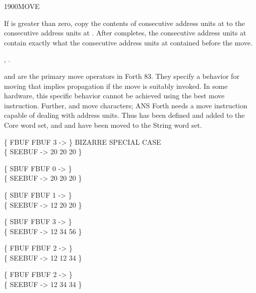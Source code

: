 \begin{worddef}{1900}{MOVE}
\item {}

	If  is greater than zero, copy the contents of 
	consecutive address units at  to the 
	consecutive address units at . After 
	completes, the  consecutive address units at 
	contain exactly what the  consecutive address units at
	 contained before the move.

\see	{},
	.

	\begin{defer}
	\rationale %
		 and  are the primary
		move operators in Forth 83. They specify a behavior for moving
		that implies propagation if the move is suitably invoked. In
		some hardware, this specific behavior cannot be achieved using
		the best move instruction. Further,  and
		 move characters; ANS Forth needs a move
		instruction capable of dealing with address units. Thus
		 has been defined and added to the Core word set,
		and  and  have been
		moved to the String word set.

	\testing
		\{ FBUF FBUF 3   -> \} \tab[3]  BIZARRE SPECIAL CASE \\
		\{ SEEBUF -> 20 20 20 \}

		\{ SBUF FBUF 0   -> \} \\
		\{ SEEBUF -> 20 20 20 \}

		\{ SBUF FBUF 1   -> \} \\
		\{ SEEBUF -> 12 20 20 \}

		\{ SBUF FBUF 3   -> \} \\
		\{ SEEBUF -> 12 34 56 \}

		\{ FBUF FBUF  2   -> \} \\
		\{ SEEBUF -> 12 12 34 \}

		\{ FBUF  FBUF 2   -> \} \\
		\{ SEEBUF -> 12 34 34 \}
	\end{defer}
\end{worddef}


